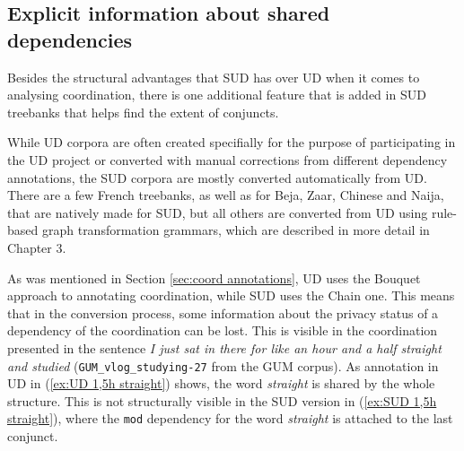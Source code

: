 
\subsection{Explicit information about shared dependencies}
Besides the structural advantages that SUD has over UD when it comes to analysing coordination, there is one additional feature that is added in SUD treebanks that helps find the extent of conjuncts. 

While UD corpora are often created specifially for the purpose of participating in the UD project or converted with manual corrections from different dependency annotations, the SUD corpora are mostly converted automatically from UD. There are a few French treebanks, as well as for Beja, Zaar, Chinese and Naija, that are natively made for SUD, but all others are converted from UD using rule-based graph transformation grammars, which are described in more detail in Chapter 3. 

As was mentioned in Section \ref{sec:coord annotations}, UD uses the Bouquet approach to annotating coordination, while SUD uses the Chain one. This means that in the conversion process, some information about the privacy status of a dependency of the coordination can be lost. This is visible in the coordination presented in the sentence \textsl{I just sat in there for like an hour and a half straight and studied} (\texttt{GUM\_vlog\_studying-27} from the GUM corpus). As annotation in UD in (\ref{ex:UD 1,5h straight}) shows, the word \textsl{straight} is shared by the whole structure. This is not structurally visible in the SUD version in (\ref{ex:SUD 1,5h straight}), where the \texttt{mod} dependency for the word \textsl{straight} is attached to the last conjunct. 


